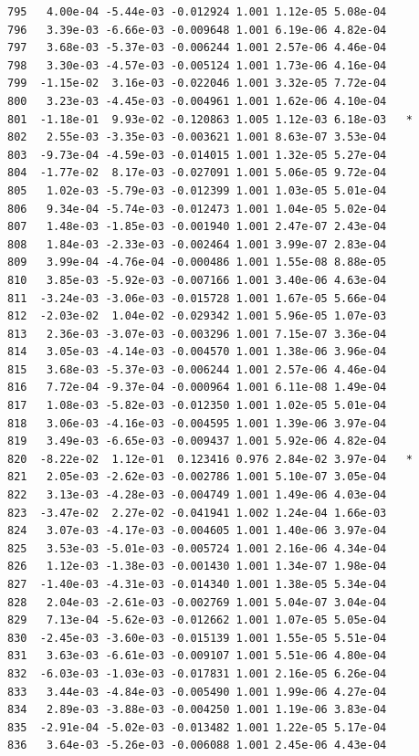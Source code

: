 \documentclass[
  letterpaper,
  DIV=11,
  numbers=noendperiod]{scrartcl}
\begin{document}
\begin{verbatim}
795   4.00e-04 -5.44e-03 -0.012924 1.001 1.12e-05 5.08e-04    
796   3.39e-03 -6.66e-03 -0.009648 1.001 6.19e-06 4.82e-04    
797   3.68e-03 -5.37e-03 -0.006244 1.001 2.57e-06 4.46e-04    
798   3.30e-03 -4.57e-03 -0.005124 1.001 1.73e-06 4.16e-04    
799  -1.15e-02  3.16e-03 -0.022046 1.001 3.32e-05 7.72e-04    
800   3.23e-03 -4.45e-03 -0.004961 1.001 1.62e-06 4.10e-04    
801  -1.18e-01  9.93e-02 -0.120863 1.005 1.12e-03 6.18e-03   *
802   2.55e-03 -3.35e-03 -0.003621 1.001 8.63e-07 3.53e-04    
803  -9.73e-04 -4.59e-03 -0.014015 1.001 1.32e-05 5.27e-04    
804  -1.77e-02  8.17e-03 -0.027091 1.001 5.06e-05 9.72e-04    
805   1.02e-03 -5.79e-03 -0.012399 1.001 1.03e-05 5.01e-04    
806   9.34e-04 -5.74e-03 -0.012473 1.001 1.04e-05 5.02e-04    
807   1.48e-03 -1.85e-03 -0.001940 1.001 2.47e-07 2.43e-04    
808   1.84e-03 -2.33e-03 -0.002464 1.001 3.99e-07 2.83e-04    
809   3.99e-04 -4.76e-04 -0.000486 1.001 1.55e-08 8.88e-05    
810   3.85e-03 -5.92e-03 -0.007166 1.001 3.40e-06 4.63e-04    
811  -3.24e-03 -3.06e-03 -0.015728 1.001 1.67e-05 5.66e-04    
812  -2.03e-02  1.04e-02 -0.029342 1.001 5.96e-05 1.07e-03    
813   2.36e-03 -3.07e-03 -0.003296 1.001 7.15e-07 3.36e-04    
814   3.05e-03 -4.14e-03 -0.004570 1.001 1.38e-06 3.96e-04    
815   3.68e-03 -5.37e-03 -0.006244 1.001 2.57e-06 4.46e-04    
816   7.72e-04 -9.37e-04 -0.000964 1.001 6.11e-08 1.49e-04    
817   1.08e-03 -5.82e-03 -0.012350 1.001 1.02e-05 5.01e-04    
818   3.06e-03 -4.16e-03 -0.004595 1.001 1.39e-06 3.97e-04    
819   3.49e-03 -6.65e-03 -0.009437 1.001 5.92e-06 4.82e-04    
820  -8.22e-02  1.12e-01  0.123416 0.976 2.84e-02 3.97e-04   *
821   2.05e-03 -2.62e-03 -0.002786 1.001 5.10e-07 3.05e-04    
822   3.13e-03 -4.28e-03 -0.004749 1.001 1.49e-06 4.03e-04    
823  -3.47e-02  2.27e-02 -0.041941 1.002 1.24e-04 1.66e-03    
824   3.07e-03 -4.17e-03 -0.004605 1.001 1.40e-06 3.97e-04    
825   3.53e-03 -5.01e-03 -0.005724 1.001 2.16e-06 4.34e-04    
826   1.12e-03 -1.38e-03 -0.001430 1.001 1.34e-07 1.98e-04    
827  -1.40e-03 -4.31e-03 -0.014340 1.001 1.38e-05 5.34e-04    
828   2.04e-03 -2.61e-03 -0.002769 1.001 5.04e-07 3.04e-04    
829   7.13e-04 -5.62e-03 -0.012662 1.001 1.07e-05 5.05e-04    
830  -2.45e-03 -3.60e-03 -0.015139 1.001 1.55e-05 5.51e-04    
831   3.63e-03 -6.61e-03 -0.009107 1.001 5.51e-06 4.80e-04    
832  -6.03e-03 -1.03e-03 -0.017831 1.001 2.16e-05 6.26e-04    
833   3.44e-03 -4.84e-03 -0.005490 1.001 1.99e-06 4.27e-04    
834   2.89e-03 -3.88e-03 -0.004250 1.001 1.19e-06 3.83e-04    
835  -2.91e-04 -5.02e-03 -0.013482 1.001 1.22e-05 5.17e-04    
836   3.64e-03 -5.26e-03 -0.006088 1.001 2.45e-06 4.43e-04    

\end{verbatim}
\end{document}
